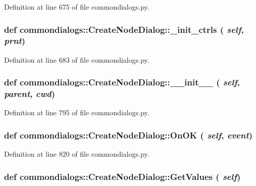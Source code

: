 Definition at line 675 of file commondialogs.py.\hypertarget{classcommondialogs_1_1CreateNodeDialog_429fa9f55c65a135c19b01222b58d797}{
\subsubsection[\_\-init\_\-ctrls]{\setlength{\rightskip}{0pt plus 5cm}def commondialogs::Create\-Node\-Dialog::\_\-init\_\-ctrls ( {\em self},  {\em prnt})}}
\label{classcommondialogs_1_1CreateNodeDialog_429fa9f55c65a135c19b01222b58d797}




Definition at line 683 of file commondialogs.py.\hypertarget{classcommondialogs_1_1CreateNodeDialog_58c8aa89d480669890ef63456d126705}{
\subsubsection[\_\-\_\-init\_\-\_\-]{\setlength{\rightskip}{0pt plus 5cm}def commondialogs::Create\-Node\-Dialog::\_\-\_\-init\_\-\_\- ( {\em self},  {\em parent},  {\em cwd})}}
\label{classcommondialogs_1_1CreateNodeDialog_58c8aa89d480669890ef63456d126705}




Definition at line 795 of file commondialogs.py.\hypertarget{classcommondialogs_1_1CreateNodeDialog_1099b975b697d76a4a7ecdaef82b7f60}{
\subsubsection[OnOK]{\setlength{\rightskip}{0pt plus 5cm}def commondialogs::Create\-Node\-Dialog::On\-OK ( {\em self},  {\em event})}}
\label{classcommondialogs_1_1CreateNodeDialog_1099b975b697d76a4a7ecdaef82b7f60}




Definition at line 820 of file commondialogs.py.\hypertarget{classcommondialogs_1_1CreateNodeDialog_f62fdd3d1fbbea86a3eb716f20341b49}{
\subsubsection[GetValues]{\setlength{\rightskip}{0pt plus 5cm}def commondialogs::Create\-Node\-Dialog::Get\-Values ( {\em self})}}
\label{classcommondialogs_1_1CreateNodeDialog_f62fdd3d1fbbea86a3eb716f20341b49}




